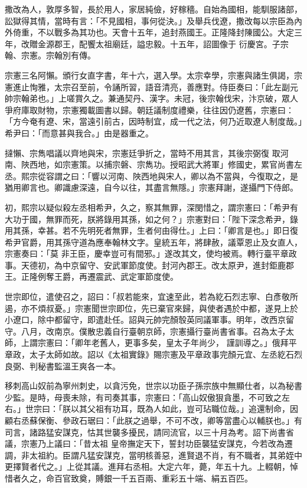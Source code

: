 \begin{pinyinscope}
 撒改為人，敦厚多智，長於用人，家居純儉，好稼穡。自始為國相，能馴服諸部，訟獄得其情，當時有言：「不見國相，事何從決。」及舉兵伐遼，撒改每以宗臣為內外倚重，不以戰多為其功也。天會十五年，追封燕國王。正隆降封陳國公。大定三年，改贈金源郡王，配饗太祖廟廷，謚忠毅。十五年，詔圖像于
 衍慶宮。子宗翰、宗憲。宗翰別有傳。



 宗憲三名阿懶。頒行女直字書，年十六，選入學。太宗幸學，宗憲與諸生俱謁，宗憲進止恂雅，太宗召至前，令誦所習，語音清亮，善應對。侍臣奏曰：「此左副元帥宗翰弟也。」上嗟賞久之。兼通契丹、漢字。未冠，後宗翰伐宋，汴京破，眾人爭府庫取財物，宗憲獨載圖書以歸。朝廷議制度禮樂，往往因仍遼舊，宗憲曰：「方今奄有遼、宋，當遠引前古，因時制宜，成一代之法，何乃近取遼人制度哉。」希尹曰：「而意甚與我合。」由是器重之。



 撻懶、宗雋唱議以齊地與宋，宗憲廷爭折之，當時不用其言，其後宗弼復
 取河南、陜西地，如宗憲策。以捕宗磐、宗雋功。授昭武大將軍」修國史，累官尚書左丞。熙宗從容謂之曰：「響以河南、陜西地與宋人，卿以為不當與，今復取之，是猶用卿言也。卿識慮深遠，自今以往，其盡言無隱。」宗憲拜謝，遂攝門下侍郎。



 初，熙宗以疑似殺左丞相希尹，久之，察其無罪，深閔惜之，謂宗憲曰：「希尹有大功于國，無罪而死，朕將錄用其孫，如之何？」宗憲對曰：「陛下深念希尹，錄用其孫，幸甚。若不先明死者無罪，生者何由得仕。」上曰：「卿言是也。」即日復希尹官爵，用其孫守道為應奉翰林文字。皇統五年，將肆赦，議覃恩止及女直人，宗憲奏曰：「莫
 非王臣，慶幸豈可有間邪。」遂改其文，使均被焉。轉行臺平章政事。天德初，為中京留守、安武軍節度使。封河內郡王。改太原尹，進封鉅鹿郡王。正隆例奪王爵，再遷震武、武定軍節度使。



 世宗即位，遣使召之，詔曰：「叔若能來，宜速至此，若為紇石烈志寧、白彥敬所遏，亦不煩叔憂。」宗憲聞世宗即位，先已棄官來歸，與使者遇於中都，遂見上於小遼口，除中都留守，即遣赴任。詔與元帥完顏彀英同議軍事。明年，改西京留守。八月，改南京。僕散忠義自行臺朝京師，宗憲攝行臺尚書省事。召為太子太師，上謂宗憲曰：「卿年老舊人，更事多矣，皇太子年尚少，
 謹訓導之。」俄拜平章政，太子太師如故。詔以《太祖實錄》賜宗憲及平章政事完顏元宜、左丞紇石烈良弼、判秘書監溫王爽各一本。



 移刺高山奴前為寧州刺史，以貪污免，世宗以功臣子孫宗族中無顯仕者，以為秘書少監。是時，母喪未除，有司奏其事，宗憲曰：「高山奴傲狠貪墨，不可致之左右。」世宗曰：「朕以其父祖有功耳，既為人如此，豈可玷職位哉。」追還制命，因顧右丞蘇保衡、參政石琚曰：「此朕之過舉，不可不改，卿等當盡心以輔朕也。」有司言，諸路猛安謀克，怙其世襲多擾民，請同流官，以三十月為考。詔下尚書省議，宗憲乃上議曰：「昔太祖
 皇帝撫定天下，誓封功臣襲猛安謀克，今若改為遷調，非太祖約。臣謂凡猛安謀克，當明核善惡，進賢退不肖，有不職者，其弟姪中更擇賢者代之。」上從其議。進拜右丞相。大定六年，薨，年五十九。上輟朝，悼惜者久之，命百官致奠，賻銀一千五百兩、重彩五十端、絹五百匹。




\end{pinyinscope}
